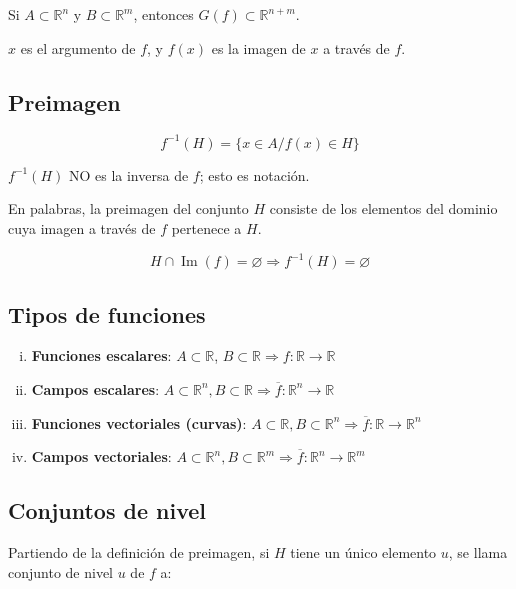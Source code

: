 \documentclass{article}
\renewcommand{\Bbb}{\mathbb}
\begin{document}
Si $A \subset \Bbb R^n$ y $B \subset \Bbb R^m$, entonces $G(f) \subset \Bbb R^{n+m}$.

$x$ es el argumento de $f$, y $f(x)$ es la imagen de $x$ a través de $f$.

\subsection{Preimagen}

\begin{equation}
f^{-1}(H) = \{ x \in A / f(x) \in H \}
\end{equation}

$f^{-1}(H)$ NO es la inversa de $f$; esto es notación.

En palabras, la preimagen del conjunto $H$ consiste de los elementos del dominio cuya imagen a través de $f$ pertenece a $H$.

\begin{equation}
H \cap \mathop{Im}(f) = \varnothing \Longrightarrow f^{-1}(H) = \varnothing
\end{equation}

\subsection{Tipos de funciones}

\begin{enumerate}[i)]
\item \textbf{Funciones escalares}: $A \subset \Bbb R$, $B \subset \Bbb R \Longrightarrow f: \Bbb R \rightarrow \Bbb R$

\item \textbf{Campos escalares}: $A \subset \Bbb R^n, B \subset \Bbb R \Longrightarrow \overline{f}: \Bbb R^n \rightarrow \Bbb R$

\item \textbf{Funciones vectoriales (curvas)}: $A \subset \Bbb R, B \subset \Bbb R^n \Longrightarrow \overline{f}: \Bbb R \rightarrow \Bbb R^n$

\item \textbf{Campos vectoriales}: $A \subset \Bbb R^n, B \subset \Bbb R^m \Longrightarrow \overline{f}: \Bbb R^n \rightarrow \Bbb R^m$
\end{enumerate}

\subsection{Conjuntos de nivel}

Partiendo de la definición de preimagen, si $H$ tiene un único elemento $u$, se llama conjunto de nivel $u$ de $f$ a:
\end{document}
